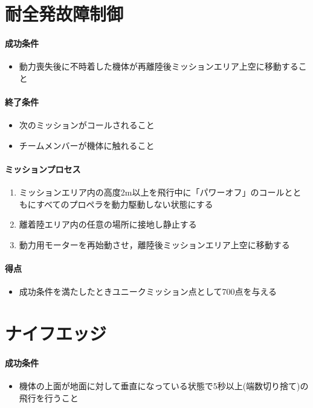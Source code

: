 \documentclass[a4paper,12pt,oneside]{jsarticle}
\begin{document}
\newpage
\section{耐全発故障制御}
\paragraph{成功条件}
\begin{itemize}
  \item 動力喪失後に不時着した機体が再離陸後ミッションエリア上空に移動すること
\end{itemize}

\paragraph{終了条件}
\begin{itemize}
  \item 次のミッションがコールされること
  \item チームメンバーが機体に触れること
\end{itemize}

\paragraph{ミッションプロセス}
\begin{enumerate}
  \item ミッションエリア内の高度2m以上を飛行中に「パワーオフ」のコールとともにすべてのプロペラを動力駆動しない状態にする
  \item 離着陸エリア内の任意の場所に接地し静止する
  \item 動力用モーターを再始動させ，離陸後ミッションエリア上空に移動する
\end{enumerate}

\paragraph{得点}
\begin{itemize}
  \item 成功条件を満たしたときユニークミッション点として700点を与える
\end{itemize}

\newpage
\section{ナイフエッジ}
\paragraph{成功条件}
\begin{itemize}
  \item 機体の上面が地面に対して垂直になっている状態で5秒以上(端数切り捨て)の飛行を行うこと
\end{itemize}
\end{document}
